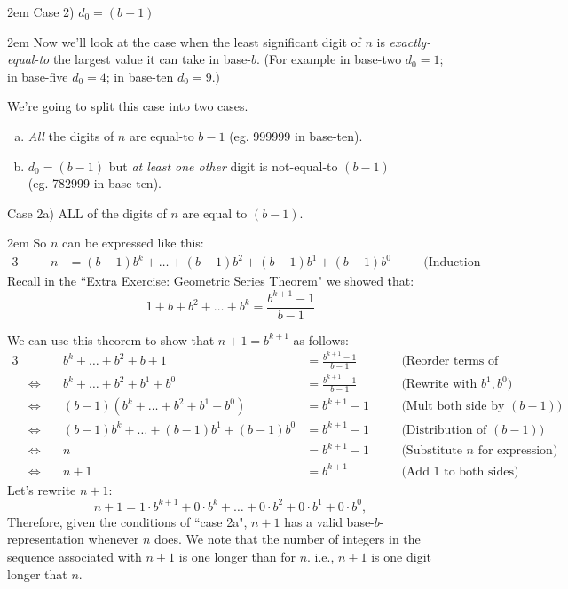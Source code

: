 \documentclass{article}
\newenvironment{jprIn}{\begin{adjustwidth}{2em}{}}{\end{adjustwidth}}
\begin{document}
\begin{jprIn}
\bigskip
Case 2) $d_0=(b-1)$
\begin{jprIn}
Now we'll look at the case when the least significant digit of $n$ is \emph{exactly-equal-to}
the largest value it can take in base-$b$.
(For example in base-two
$d_0=1$; in base-five
$d_0=4$; in base-ten $d_0=9$.)

We're going to split this case into two cases.

\begin{enumerate}[a)]
\item \emph{All} the digits of $n$ are equal-to $b{-}1$ (eg. 999999 in base-ten).
\item $d_0=(b-1)$ but \emph{at least one other} digit is not-equal-to $(b-1)$\\
(eg. 782999 in base-ten).
\end{enumerate}
%

Case 2a) ALL of the digits of $n$ are equal to $(b-1)$.
\begin{jprIn}
So $n$ can be expressed like this:
\begin{alignat*}{3}
  &\quad&n
  &= (b{-}1)b^k+\dots{}+(b{-}1)b^2+(b{-}1)b^1+(b{-}1)b^0 &&\quad\text{(Induction Assumption)}
\end{alignat*}
Recall in the ``Extra Exercise: Geometric Series Theorem"
we showed that:
\[1+b+b^2+\dots{}+b^k=\frac{b^{k+1}-1}{b-1}\]

We can use this theorem to show that $n+1=b^{k+1}$ as follows:
\smallskip
{\small
\begin{alignat*}{3}
  &&b^k+\dots{}+b^2+b+1
  &= \frac{b^{k+1}-1}{b-1} &&\quad\text{(Reorder terms of G.S.Thm.)}\\
  &\Leftrightarrow\quad
  &b^k+\dots{}+b^2+b^1+b^0
  &= \frac{b^{k+1}-1}{b-1} &&\quad\text{(Rewrite with }b^1, b^0\text{)}\\
  &\Leftrightarrow\quad
  &(b-1)(b^k+\dots{}+b^2+b^1+b^0)
  &= b^{k+1}-1 &&\quad\text{(Mult both side by }(b{-}1)\text{)}\\
  &\Leftrightarrow\quad
  &(b{-}1)b^k+\dots{}+(b{-}1)b^1+(b{-}1)b^0
  &= b^{k+1}-1 &&\quad\text{(Distribution of }(b{-}1)\text{)}\\
  &\Leftrightarrow\quad
  &n
  &= b^{k+1}-1 &&\quad\text{(Substitute }n\text{ for expression)}\\
  &\Leftrightarrow\quad
  &n+1
  &= b^{k+1} &&\quad\text{(Add 1 to both sides)}
\end{alignat*}
}Let's rewrite $n+1$:
\[n+1= 1\cdot{}b^{k+1}+0\cdot{}b^{k}+\dots{}+0\cdot{}b^2+0\cdot{}b^1+0\cdot{}b^0,\]
Therefore, given the conditions of ``case 2a", $n+1$ has
a valid base-$b$-representation whenever $n$ does.
We note that
the number of integers in the sequence associated
with $n+1$ is one longer than for $n$. i.e., $n+1$ is one digit longer that $n$.


\end{jprIn}
\end{jprIn}
\end{jprIn}
\end{document}
